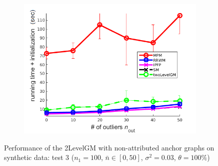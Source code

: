 \begin{figure}
\begin{subfigure}[b]{0.33\textwidth}
			\includegraphics[scale=0.33]{"chapter3/fig/SyntheticTest/no_descr/Results_v4.3.3/Test1/time_summary_avg10t"} 
		\end{subfigure} 	
	\caption[Performance of the 2LevelGM with non-attributed anchor graphs on synthetic data (test $3$)]{Performance of the 2LevelGM with non-attributed anchor graphs on synthetic data: test $3$ ($n_1=100$, $\bar{n}\in[0,50]$, $\sigma^2=0.03$, $\theta=100\%$)}
	\label{fig:synTest3_ver433}
\end{figure}
